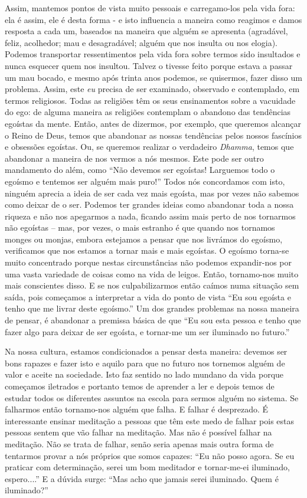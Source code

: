 Assim, mantemos pontos de vista muito pessoais e carregamo-los pela vida
fora: ela é assim, ele é desta forma - e isto influencia a maneira como
reagimos e damos resposta a cada um, baseados na maneira que alguém se
apresenta (agradável, feliz, acolhedor; mau e desagradável; alguém que
nos insulta ou nos elogia). Podemos transportar ressentimentos pela vida
fora sobre termos sido insultados e nunca esquecer quem nos insultou.
Talvez o tivesse feito porque estava a passar um mau bocado, e mesmo
após trinta anos podemos, se quisermos, fazer disso um problema. Assim,
este \emph{eu} precisa de ser examinado, observado e contemplado, em
termos religiosos. Todas as religiões têm os seus ensinamentos sobre a
vacuidade do ego: de alguma maneira as religiões contemplam o abandono
das tendências egoístas da mente. Então, antes de dizermos, por exemplo,
que queremos alcançar o Reino de Deus, temos que abandonar as nossas
tendências pelos nossos fascínios e obsessões egoístas. Ou, se queremos
realizar o verdadeiro \emph{Dhamma}, temos que abandonar a maneira de
nos vermos a nós mesmos. Este pode ser outro mandamento do além, como
``Não devemos ser egoístas! Larguemos todo o egoísmo e tentemos ser
alguém mais puro!'' Todos nós concordamos com isto, ninguém aprecia a
ideia de ser cada vez mais egoísta, mas por vezes não sabemos como
deixar de o ser. Podemos ter grandes ideias como abandonar toda a nossa
riqueza e não nos apegarmos a nada, ficando assim mais perto de nos
tornarmos não egoístas -- mas, por vezes, o mais estranho é que quando
nos tornamos monges ou monjas, embora estejamos a pensar que nos
livrámos do egoísmo, verificamos que nos estamos a tornar mais e mais
egoístas. O egoísmo torna-se muito concentrado porque nestas
circunstâncias não podemos expandir-nos por uma vasta variedade de
coisas como na vida de leigos. Então, tornamo-nos muito mais conscientes
disso. E se nos culpabilizarmos então caímos numa situação sem saída,
pois começamos a interpretar a vida do ponto de vista ``Eu sou egoísta e
tenho que me livrar deste egoísmo.'' Um dos grandes problemas na nossa
maneira de pensar, é abandonar a premissa básica de que ``Eu sou esta
pessoa e tenho que fazer algo para deixar de ser egoísta, e tornar-me um
ser iluminado no futuro.''

Na nossa cultura, estamos condicionados a pensar desta maneira: devemos
ser bons rapazes e fazer isto e aquilo para que no futuro nos tornemos
alguém de valor e aceite na sociedade. Isto faz sentido no lado mundano
da vida porque começamos iletrados e portanto temos de aprender a ler e
depois temos de estudar todos os diferentes assuntos na escola para
sermos alguém no sistema. Se falharmos então tornamo-nos alguém que
falha. E falhar é desprezado. É interessante ensinar meditação a pessoas
que têm este medo de falhar pois estas pessoas sentem que vão falhar na
meditação. Mas não é possível falhar na meditação. Não se trata de
falhar, senão seria apenas mais outra forma de tentarmos provar a nós
próprios que somos capazes: ``Eu não posso agora. Se eu praticar com
determinação, serei um bom meditador e tornar-me-ei iluminado,
espero....'' E a dúvida surge: ``Mas acho que jamais serei iluminado.
Quem é iluminado?''

